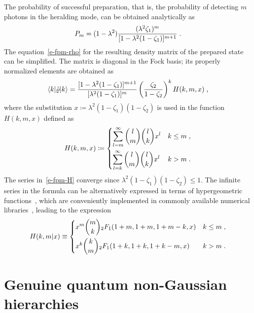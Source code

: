 \documentclass{article}
\begin{document}
The probability of successful preparation, that is, the probability of detecting $m$ photons in the heralding mode, can be obtained analytically as
%
\begin{equation}\label{e-fpm-pro}
  P_{m} = (1 - \lambda^{2}) 
  \frac
    { (\lambda^{2} \zeta_{1})^{m} }
    { [ 1 - \lambda^{2} (1 - \zeta_{1}) ]^{m + 1} } \;\text{.}
\end{equation}
%
The equation~\eqref{e-fpm-rho} for the resulting density matrix of the prepared state can be simplified. The matrix is diagonal in the Fock basis; its properly normalized elements are obtained as
%
\begin{equation}\label{e-fpm-rho-el}
  \braket{ k | \hat{\varrho} | k } =
  \frac
    { [ 1 - \lambda^{2} (1 - \zeta_{1}) ]^{m + 1} }
    { [ \lambda^{2} (1 - \zeta_{1}) ]^{m} }
  \left( \frac{ \zeta_{2} }{ 1 - \zeta_{2} } \right)^{k}
  H (k, m, x) \;\text{,}
\end{equation}
%
where the substitution ${x \coloneqq \lambda^{2} ( 1 - \zeta_{1} )(1 - \zeta_{2} )}$ is used in the function $H(k, m, x)$ defined as
%
\begin{equation}\label{e-fpm-H}
  H(k, m, x) \coloneq
  \begin{dcases}
    \sum_{l = m}^{\infty}
      \binom{l}{m}
      \binom{l}{k}
      x^{l} 
    & k \leq m \;\text{,} \\
    \sum_{l = k}^{\infty}
      \binom{l}{m}
      \binom{l}{k}
      x^{l}
    & k > m \;\text{.}
  \end{dcases}
\end{equation}
%
The series in~\eqref{e-fpm-H} converge since ${\lambda^{2} ( 1 - \zeta_{1} )(1 - \zeta_{2} ) \leq 1}$. The infinite series in the formula can be alternatively expressed in terms of hypergeometric functions~\cite{bateman1981}, which are conveniently implemented in commonly available numerical libraries~\cite{virtanen2020}, leading to the expression
%
\begin{equation}
  H(k, m \vert x) \equiv
  \begin{dcases}
    x^{m} \binom{m}{k} {}_{2}F_{1} (1 + m, 1 + m, 1 + m - k, x)
    & k \leq m \;\text{,} \\
    x^{k} \binom{k}{m} {}_{2}F_{1} (1 + k, 1 + k, 1 + k - m, x)
    & k > m \;\text{.}
  \end{dcases}
\end{equation}

%
%

\section{Genuine quantum non-Gaussian hierarchies}
\end{document}
